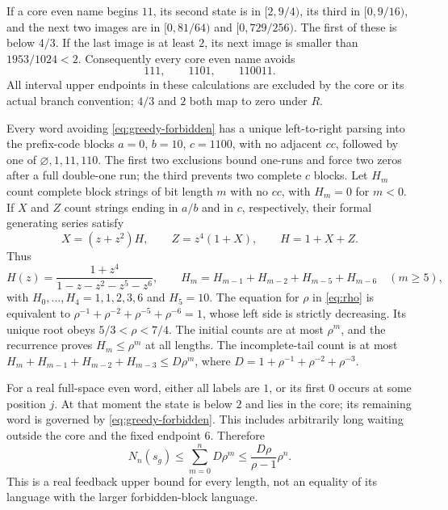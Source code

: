 \documentclass[11pt,reqno]{amsart}
\numberwithin{equation}{section}
\theoremstyle{definition}
\theoremstyle{definition}
\begin{document}
If a core even name begins $11$, its second state is in
$[2,9/4)$, its third in $[0,9/16)$, and the next two images
are in $[0,81/64)$ and $[0,729/256)$. The first of these
is below $4/3$. If the last image is at least $2$, its next
image is smaller than $1953/1024<2$.
Consequently every core even name avoids
\begin{equation}\label{eq:greedy-forbidden}
 111,\qquad1101,\qquad110011.
\end{equation}
All interval upper endpoints in these calculations are excluded by
the core or its actual branch convention; $4/3$ and $2$ both
map to zero under $R$.

Every word avoiding \eqref{eq:greedy-forbidden} has a unique
left-to-right parsing into the prefix-code blocks
$a=0$, $b=10$, $c=1100$, with no adjacent $cc$, followed by
one of $\varnothing,1,11,110$. The first two exclusions bound
one-runs and force two zeros after a full double-one run; the third
prevents two complete $c$ blocks. Let $H_m$ count complete block
strings of bit length $m$ with no $cc$, with $H_m=0$ for
$m<0$. If $X$ and $Z$ count strings ending in $a/b$ and in
$c$, respectively, their formal generating series satisfy
\[
 X=(z+z^2)H,\qquad Z=z^4(1+X),\qquad H=1+X+Z.
\]
Thus
\begin{equation}\label{eq:greedy-H}
 H(z)=\frac{1+z^4}{1-z-z^2-z^5-z^6},\qquad
 H_m=H_{m-1}+H_{m-2}+H_{m-5}+H_{m-6}\quad(m\ge5),
\end{equation}
with $H_0,\ldots,H_4=1,1,2,3,6$ and $H_5=10$.
The equation for $\rho$ in \eqref{eq:rho} is equivalent to
$\rho^{-1}+\rho^{-2}+\rho^{-5}+\rho^{-6}=1$, whose left side
is strictly decreasing. Its unique root obeys $5/3<\rho<7/4$.
The initial counts are at most $\rho^m$, and the recurrence
proves $H_m\le\rho^m$ at all lengths. The incomplete-tail
count is at most
$H_m+H_{m-1}+H_{m-2}+H_{m-3}\le D\rho^m$, where
$D=1+\rho^{-1}+\rho^{-2}+\rho^{-3}$.

For a real full-space even word, either all labels are $1$, or its
first $0$ occurs at some position $j$. At that moment the state
is below $2$ and lies in the core; its remaining word is governed
by \eqref{eq:greedy-forbidden}. This includes arbitrarily long
waiting outside the core and the fixed endpoint $6$.
Therefore
\begin{equation}\label{eq:greedy-upper}
 N_n(s_g)\le\sum_{m=0}^n D\rho^m
 \le\frac{D\rho}{\rho-1}\rho^n.
\end{equation}
This is a real feedback upper bound for every length, not an equality
of its language with the larger forbidden-block language.
\end{document}
